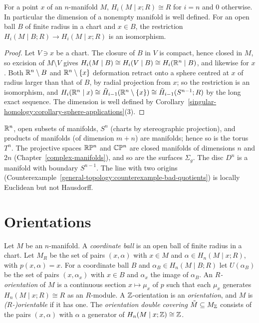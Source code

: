 \begin{lemma}\label{poincare-duality:lemma-local-homology}
For a point $x$ of an $n$-manifold $M$, $H_i(M \mid x; R) \cong R$ for $i = n$ and $0$ otherwise. In particular the dimension of a nonempty manifold is well
defined. For an open ball $B$ of finite radius in a chart and $x \in B$, the restriction $H_i(M \mid B; R) \to H_i(M \mid x; R)$ is an isomorphism.
\end{lemma}

\begin{proof}
Let $V \ni x$ be a chart. The closure of $B$ in $V$ is compact, hence closed in $M$, so excision of $M \setminus V$ gives
$H_i(M \mid B) \cong H_i(V \mid B) \cong H_i(\mathbb{R}^n \mid B)$, and likewise for $x$. Both $\mathbb{R}^n \setminus B$ and $\mathbb{R}^n \setminus \{x\}$ deformation retract onto a sphere
centred at $x$ of radius larger than that of $B$, by radial projection from $x$; so the restriction is an isomorphism, and
$H_i(\mathbb{R}^n \mid x) \cong \tilde{H}_{i-1}(\mathbb{R}^n \setminus \{x\}) \cong \tilde{H}_{i-1}(S^{n-1}; R)$ by the long exact sequence. The dimension is well defined by
Corollary~\ref{singular-homology:corollary-sphere-applications}(3).
\end{proof}

\begin{example}\label{poincare-duality:example-manifolds}
$\mathbb{R}^n$, open subsets of manifolds, $S^n$ (charts by stereographic projection), and products of manifolds (of dimension $m + n$) are manifolds; hence so is the
torus $T^n$. The projective spaces $\mathbb{R}\mathbb{P}^n$ and $\mathbb{C}\mathbb{P}^n$ are closed manifolds of dimensions $n$ and $2n$ (Chapter~\ref{complex-manifolds}), and so are the
surfaces $\Sigma_g$. The disc $D^n$ is a manifold with boundary $S^{n-1}$. The line with two origins
(Counterexample~\ref{general-topology:counterexample-bad-quotients}) is locally Euclidean but not Hausdorff.
\end{example}

\section{Orientations}\label{poincare-duality:section-orientations}

\begin{definition}\label{poincare-duality:definition-orientation-covering}
Let $M$ be an $n$-manifold. A \emph{coordinate ball} is an open ball of finite radius in a chart. Let $M_R$ be the set of pairs $(x, \alpha)$ with $x \in M$ and
$\alpha \in H_n(M \mid x; R)$, with $p(x, \alpha) = x$. For a coordinate ball $B$ and $\alpha_B \in H_n(M \mid B; R)$ let $U(\alpha_B)$ be the set of pairs
$(x, \alpha_x)$ with $x \in B$ and $\alpha_x$ the image of $\alpha_B$. An \emph{$R$-orientation} of $M$ is a continuous section $x \mapsto \mu_x$ of $p$ such that
each $\mu_x$ generates $H_n(M \mid x; R) \cong R$ as an $R$-module. A $\mathbb{Z}$-orientation is an \emph{orientation}, and $M$ is \emph{($R$-)orientable} if it has one.
The \emph{orientation double covering} $\tilde{M} \subseteq M_{\mathbb{Z}}$ consists of the pairs $(x, \alpha)$ with $\alpha$ a generator of $H_n(M \mid x; \mathbb{Z}) \cong \mathbb{Z}$.
\end{definition}


